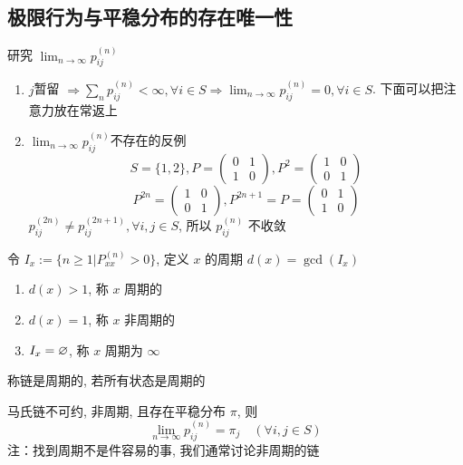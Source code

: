 \subsection{极限行为与平稳分布的存在唯一性}
研究 $\displaystyle \lim_{n\to \infty}p_{ij}^{(n)}$
\begin{enumerate}
    \item $j$暂留 $\Rightarrow \sum_{n}p_{ij}^{(n)}<\infty,\forall i\in S\Rightarrow \lim_{n\to \infty}p_{ij}^{(n)}=0,\forall i\in S$. 下面可以把注意力放在常返上
    \item $\lim_{n\to \infty}p_{ij}^{(n)}$不存在的反例
    \[
    S=\{1,2\}, P=\begin{pmatrix}
        0&1\\
        1&0
    \end{pmatrix}, P^2=\begin{pmatrix}
        1&0\\
        0&1
    \end{pmatrix}
    \]
    \[
    P^{2n}=\begin{pmatrix}
        1&0\\
        0&1
    \end{pmatrix}, P^{2n+1}=P=\begin{pmatrix}
        0&1\\
        1&0
    \end{pmatrix}
    \]
    $p_{ij}^{(2n)}\neq p_{ij}^{(2n+1)},\forall i,j\in S$, 所以 $p_{ij}^{(n)}$ 不收敛
\end{enumerate}

\begin{definition}[周期]\label{def:cycle}
    令 $I_x:=\{n\geq 1|P_{xx}^{(n)}>0\}$, 定义 $x$ 的周期 $d(x)=\gcd(I_x)$
    \begin{enumerate}
        \item $d(x)>1$, 称 $x$ 周期的
        \item $d(x)=1$, 称 $x$ 非周期的
        \item $I_x=\varnothing$, 称 $x$ 周期为 $\infty$
    \end{enumerate}
\end{definition}

\begin{definition}
    称链是周期的, 若所有状态是周期的
\end{definition}

\begin{theorem}[收敛定理]
    马氏链不可约, 非周期, 且存在平稳分布 $\pi$, 则
    \[
    \lim_{n\to\infty}p_{ij}^{(n)}=\pi_j\quad (\forall i,j\in S)
    \]
    注：找到周期不是件容易的事, 我们通常讨论非周期的链
\end{theorem}

